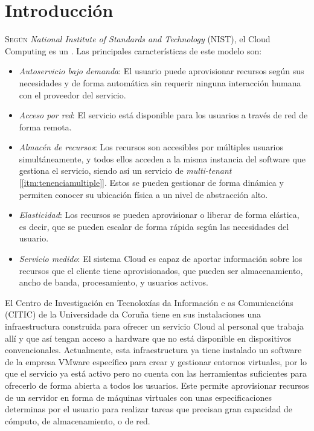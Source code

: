 \chapter{Introducción}
\label{chap:introducion}
\lettrine{S}{egún} \textit{National Institute of Standards and Technology} (NIST), el Cloud Computing es un \cite{DefCloudComputing}. Las principales características de este modelo son\label{nist}:
\begin{itemize}
    \item \emph{Autoservicio bajo demanda}: El usuario puede aprovisionar recursos según sus necesidades y de forma automática sin requerir ninguna interacción humana con el proveedor del servicio.
    \item \emph{Acceso por red}: El servicio está disponible para los usuarios a través de red de forma remota.
    \item \emph{Almacén de recursos}: Los recursos son accesibles por múltiples usuarios simultáneamente, y todos ellos acceden a la misma instancia del software que gestiona el servicio, siendo así un servicio de \textit{multi-tenant} [\ref{itm:tenenciamultiple}]. Estos se pueden gestionar de forma dinámica y permiten conocer su ubicación física a un nivel de abstracción alto.
    \item \emph{Elasticidad}: Los recursos se pueden aprovisionar o liberar de forma elástica, es decir, que se pueden escalar de forma rápida según las necesidades del usuario.
    \item \emph{Servicio medido}: El sistema Cloud es capaz de aportar información sobre los recursos que el cliente tiene aprovisionados, que pueden ser almacenamiento, ancho de banda, procesamiento, y usuarios activos.
\end{itemize}
 
 El Centro de Investigación en Tecnoloxías da Información e as Comunicacións (CITIC) de la Universidade da Coruña tiene en sus instalaciones una infraestructura construida para ofrecer un servicio Cloud al personal que trabaja allí y que así tengan acceso a hardware que no está disponible en dispositivos convencionales. Actualmente, esta infraestructura ya tiene instalado un software de la empresa VMware específico para crear y gestionar entornos virtuales, por lo que el servicio ya está activo pero no cuenta con las herramientas suficientes para ofrecerlo de forma abierta a todos los usuarios. Este permite aprovisionar recursos de un servidor en forma de máquinas virtuales con unas especificaciones determinas por el usuario para realizar tareas que precisan gran capacidad de cómputo, de almacenamiento, o de red.\\
 
